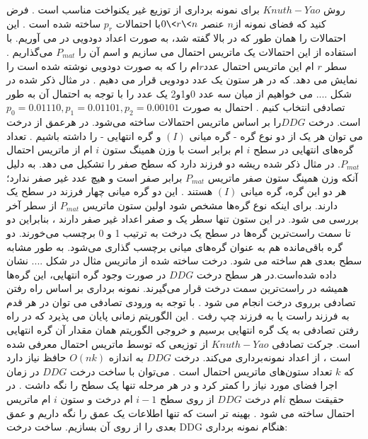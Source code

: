 روش $Knuth-Yao$ برای نمونه برداری از توزیع غیر یکنواخت مناسب است . فرض کنید که فضای نمونه از$ n$  عنصر $0\< r \< n$با احتمالات  $p_{r}$ ساخته شده است . این احتمالات را همان طور که در بالا گفته شد، به صورت اعداد دودویی در می آوریم.   با استفاده از این احتمالات یک ماتریس احتمال می سازیم و اسم آن را $P_{mat}$  می‌گذاریم . سطر $ r$ ام این ماتریس احتمال عدد$ r $ام را که به صورت دودویی نوشته شده است را  نمایش می دهد. که در هر ستون یک عدد دودویی قرار می دهیم .  در مثال ذکر شده در شکل .... می خواهیم از میان سه عدد 0و1و2  یک عدد را با توجه به احتمال آن به طور تصادفی انتخاب کنیم . احتمال به صورت $p_{0}= 0.01110, p_{1} = 0.01101, p_{2} = 0.00101$ است. 
درخت $DDG $را  بر اساس ماتریس احتمالات ساخته می‌شود. در هرعمق از درخت می توان  هر یک از دو نوع گره - گره میانی $(I)$ و گره انتهایی - را داشته باشیم . تعداد گره‌های انتهایی در سطح $i$ ام برابر است با وزن همینگ ستون $i$ ام از ماتریس احتمال $P_{mat}$.  در مثال ذکر شده ریشه دو فرزند دارد که سطح صفر را تشکیل می دهد. به دلیل آنکه وزن همینگ ستون صفر ماتریس $P_{mat}$ برابر صفر است و هیچ عدد غیر صفر ندارد؛ هر دو این گره، گره میانی    $(I)$  هستند . این دو گره میانی چهار فرزند در سطح یک دارند. برای اینکه نوع گره‌ها مشخص شود اولین ستون ماتریس $P_{mat}$ از سطر آخر بررسی می شود. در این ستون تنها سطر یک و صفر اعداد غیر صفر دارند ، بنابراین  دو تا سمت راست‌ترین گره‌ها در سطح یک درخت به ترتیب  1 و 0 برچسب می‌خورند. دو گره باقی‌مانده هم به عنوان گره‌های میانی برچسب گذاری می‌شود. به طور مشابه سطح بعدی هم ساخته می شود. درخت ساخته شده از ماتریس مثال در شکل .... نشان داده شده‌است.در هر سطح درخت $DDG$ در صورت وجود گره انتهایی، این گره‌ها همیشه در راست‌ترین سمت درخت قرار می‌گیرند.
 نمونه برداری بر اساس راه رفتن تصادفی برروی درخت انجام می شود . با توجه به ورودی تصادفی  می توان در هر قدم به فرزند راست یا به فرزند چپ رفت . این الگوریتم زمانی پایان می پذیرد که در راه رفتن تصادفی به یک گره انتهایی برسیم و خروجی الگوریتم همان مقدار آن گره انتهایی است. جرکت تصادفی $Knuth-Yao$ از توزیعی که توسط ماتریس احتمال معرفی شده است ، از اعداد نمونه‌برداری می‌کند.
درخت $DDG$ به اندازه $O(nk)$ حافظ  نیاز دارد که $k $ تعداد ستون‌های ماتریس احتمال است . می‌توان با ساخت درخت $DDG$ در زمان اجرا فضای مورد نیاز را کمتر کرد و در هر مرحله تنها یک سطح را نگه داشت . در حقیقت سطح $i $ام   درخت $DDG$ از روی سطح $i-1$   ام درخت و ستون $i$ ام ماتریس احتمال ساخته می شود . بهینه تر است که تنها اطلاعات یک عمق را نگه داریم و عمق بعدی را از روی آن بسازیم. 
ساخت درخت DDG  هنگام نمونه برداری: 



